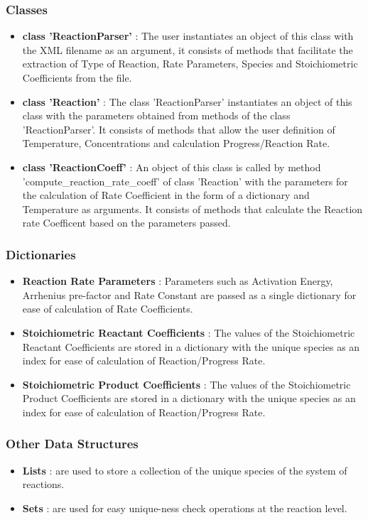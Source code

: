 \subsubsection{Classes}
\begin{itemize}
    \item \textbf{class 'ReactionParser'} : The user instantiates an object of this class with the XML filename as an argument, it consists of methods that facilitate the extraction of Type of Reaction, Rate Parameters, Species and Stoichiometric Coefficients from the file.
    \item \textbf{class 'Reaction'} : The class 'ReactionParser' instantiates an object of this class with the parameters obtained from methods of the class 'ReactionParser'. It consists of methods that allow the user definition of Temperature, Concentrations and calculation Progress/Reaction Rate.
    \item \textbf{class 'ReactionCoeff'} : An object of this class is called by method 'compute\_reaction\_rate\_coeff' of class 'Reaction' with the parameters for the calculation of Rate Coefficient in the form of a dictionary and Temperature as arguments. It consists of methods that calculate the Reaction rate Coefficent based on the parameters passed.
\end{itemize}
\subsubsection{Dictionaries}
\begin{itemize}
    \item \textbf{Reaction Rate Parameters} : Parameters such as Activation Energy, Arrhenius pre-factor and Rate Constant are passed as a single dictionary for ease of calculation of Rate Coefficients.
    \item \textbf{Stoichiometric Reactant Coefficients} : The values of the Stoichiometric Reactant Coefficients are stored in a dictionary with the unique species as an index for ease of calculation of Reaction/Progress Rate.
    \item \textbf{Stoichiometric Product Coefficients} : The values of the Stoichiometric Product Coefficients are stored in a dictionary with the unique species as an index for ease of calculation of Reaction/Progress Rate.
\end{itemize}
\subsubsection{Other Data Structures}
\begin{itemize}
    \item \textbf{Lists} : are used to store a collection of the unique species of the system of reactions.
    \item \textbf{Sets} : are used for easy unique-ness check operations at the reaction level.
\end{itemize}
\textbf{}